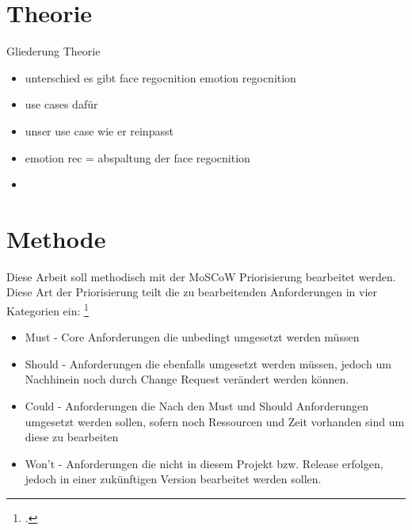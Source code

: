 \documentclass[12pt, a4paper]{scrbook}
\begin{document}
\chapter{Theorie}
Gliederung Theorie
\begin{itemize}
\item unterschied es gibt face regocnition emotion regocnition
\item use cases dafür 
\item unser use case wie er reinpasst
\item emotion rec =  abspaltung der face regocnition 
\item   
\end{itemize}




\let\cleardoublepage\relax
\newpage
\chapter{Methode}
Diese Arbeit soll methodisch mit der MoSCoW Priorisierung bearbeitet werden. Diese Art der Priorisierung teilt die zu bearbeitenden Anforderungen in vier Kategorien ein:
\footcite[vgl.][90]{Projektmanagement}
\begin{itemize}
\item Must - Core Anforderungen die unbedingt umgesetzt werden müssen
\item Should - Anforderungen die ebenfalls umgesetzt werden müssen, jedoch um Nachhinein noch durch Change Request verändert werden können.
\item Could - Anforderungen die Nach den Must und Should Anforderungen umgesetzt werden sollen, sofern noch Ressourcen und Zeit vorhanden sind um diese zu bearbeiten
\item Won't - Anforderungen die nicht in diesem Projekt bzw. Release erfolgen, jedoch in einer zukünftigen Version bearbeitet werden sollen. 
\end{itemize}
\end{document}
